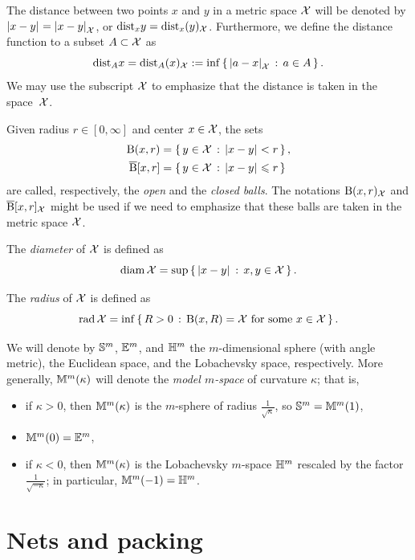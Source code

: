 The distance between two points $x$ and $y$ in a metric space $\mathcal{X}$ will be denoted by $\dist{x}{y}{}=\dist{x}{y}{\spc{X}}$, or $\mathrm{dist}_xy=\mathrm{dist}_x(y)_{\mathcal{X}}$.\label{page:|x-y|X}
Furthermore, we define the distance function to a subset $A\subset \mathcal{X}$ as
\[\distfun_Ax=\distfun_A(x)_{\spc{X}}
\df
\inf
\set{\dist{a}{x}{\spc{X}}}{a\in A}.\]
We may use the subscript $\mathcal{X}$ to emphasize
that the distance is taken in the space~${\mathcal{X}}$.

Given radius $r\in[0,\infty]$ and center $x\in \mathcal{X}$, the sets
\begin{align*}
\oBall(x,r)&=\set{y\in \spc{X}}{\dist{x}{y}{}<r},
\\
\cBall[x,r]&=\set{y\in \spc{X}}{\dist{x}{y}{}\le r}
\end{align*}
are called, respectively, the \emph{open} and the \emph{closed balls}.
The notations $\mathrm{B}{}(x,r)_{\mathcal{X}}$ and $\overline{\mathrm{B}}{}[x,r]_{\mathcal{X}}$
might be used if we need to emphasize that these balls are taken in the metric space $\mathcal{X}$.

The \emph{diameter} of $\mathcal{X}$ is defined as
\[\diam \spc{X}=\sup\set{\dist{x}{y}{}}{x,y\in \spc{X}}.\]

The \emph{radius} of $\mathcal{X}$ is defined as
\[\rad \spc{X}=\inf\set{R>0}{\oBall(x,R)= \spc{X}\ \text{for some}\ x\in\spc{X}}.\]

We will denote by $\mathbb{S}^m$, $\mathbb{E}^m$, and $\mathbb{H}^m$ the $m$-dimensional sphere (with angle metric),
the Euclidean space, and the Lobachevsky space, respectively.
More generally, $\mathbb{M}^m(\kappa)$ will denote the \emph{model $m$-space} of curvature $\kappa$;
that is,
\begin{itemize}
\item if $\kappa>0$, then $\mathbb{M}^m(\kappa)$ is the $m$-sphere of radius $\tfrac{1}{\sqrt{\kappa}}$, so $\SSS^m\z=\MM^m(1)$,
\item $\mathbb{M}^m(0)=\mathbb{E}^m$,
\item if $\kappa<0$, then $\mathbb{M}^m(\kappa)$ is the Lobachevsky $m$-space $\mathbb{H}^m$ rescaled by the factor $\tfrac{1}{\sqrt{-\kappa}}$;
in particular, $\mathbb{M}^m(-1)=\mathbb{H}^m$.
\end{itemize}

\section{Nets and packing}\label{sec:packing}

